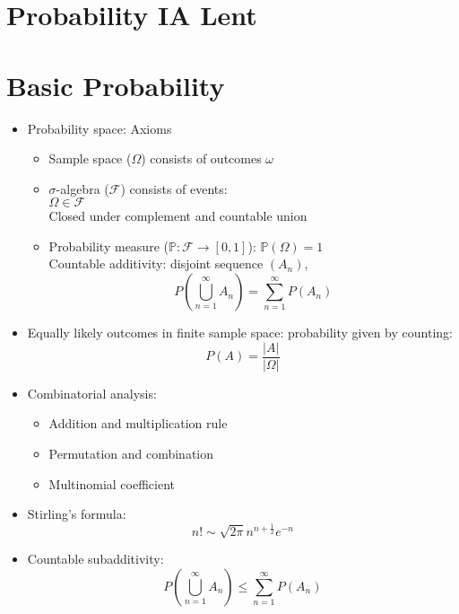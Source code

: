 

\section*{Probability \hfill IA Lent}
\section{Basic Probability}
\begin{itemize}
      \item Probability space: Axioms
            \begin{itemize}
                  \item Sample space ($\Omega$) consists of outcomes $\omega$
                  \item $\sigma$-algebra ($\mathcal{F}$) consists of events: \\
                        $\Omega \in \mathcal{F}$ \\
                        Closed under complement and countable union
                  \item Probability measure ($\mathbb{P}: \mathcal{F} \to [0,1]$): $\mathbb{P}(\Omega) = 1$ \\
                        Countable additivity: disjoint sequence $(A_n)$,
                        \[P(\bigcup_{n=1}^{\infty} A_n) = \sum_{n=1}^{\infty} P(A_n)\]
            \end{itemize}

      \item Equally likely outcomes in finite sample space: probability given by counting: \[P(A) = \frac{|A|}{|\Omega|} \]

      \item Combinatorial analysis:
            \begin{itemize}
                  \item Addition and multiplication rule
                  \item Permutation and combination
                  \item Multinomial coefficient
            \end{itemize}

      \item Stirling's formula: \[ n! \sim \sqrt{2\pi}n^{n+\frac{1}{2}}e^{-n} \]

      \item Countable subadditivity: \[P(\bigcup_{n=1}^{\infty} A_n) \leq \sum_{n=1}^{\infty} P(A_n)\]


\end{itemize}

